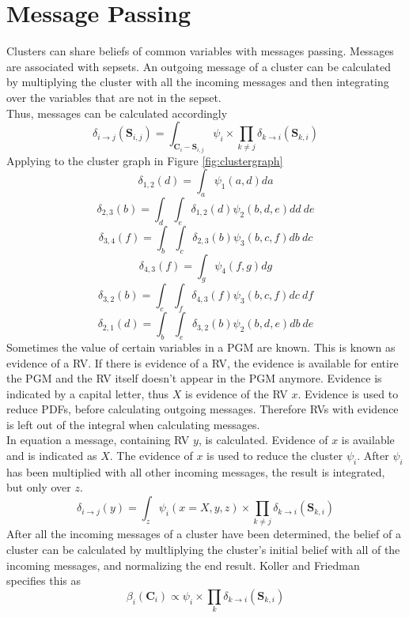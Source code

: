 \documentclass[12pt,oneside,openany,a4paper, %
afrikaans,english,
]{memoir}
\numberwithin{equation}{chapter}
\begin{document}
\section{Message Passing}
Clusters can share beliefs of common variables with messages passing. Messages are associated with sepsets. An outgoing message of a cluster can be calculated by multiplying the cluster with all the incoming messages and then integrating over the variables that are not in the sepset.
\\Thus, messages can be calculated accordingly~\citep{koller}
\begin{equation}
\delta_{i\to j}(\bm{S}_{i,j}) = \int_{\bm{C}_i - \bm{S}_{i,j}}\psi_i \times \prod_{k\ne j} \delta_{k\to i}(\bm{S}_{k,i})
\end{equation}
Applying to the cluster graph in Figure \ref{fig:clustergraph}
\begin{equation}\label{eq:del12}
\delta_{1,2}(d) = \int_a \psi_1(a,d)da
\end{equation}
\begin{equation}
\delta_{2,3}(b) = \int_d \int_e \delta_{1,2}(d)\psi_2(b,d,e)dd\ de
\end{equation}
\begin{equation}
\delta_{3,4}(f) = \int_b \int_c \delta_{2,3}(b)\psi_3(b,c,f)db\ dc
\end{equation}
\begin{equation}
\delta_{4,3}(f) = \int_g \psi_4(f,g)dg
\end{equation}
\begin{equation}
\delta_{3,2}(b) = \int_c \int_f \delta_{4,3}(f)\psi_3(b,c,f)dc\ df
\end{equation}
\begin{equation}
\delta_{2,1}(d) = \int_b \int_e \delta_{3,2}(b)\psi_2(b,d,e)db\ de
\end{equation}
Sometimes the value of certain variables in a PGM are known. This is known as evidence of a RV. If there is evidence of a RV, the evidence is available for entire the PGM and the RV itself doesn't appear in the PGM anymore. Evidence is indicated by a capital letter, thus $X$ is evidence of the RV $x$. Evidence is used to reduce PDFs, before calculating outgoing messages. Therefore RVs with evidence is left out of the integral when calculating messages.\\
In equation a message, containing RV $y$, is calculated. Evidence of $x$ is available and is indicated as $X$. The evidence of $x$ is used to reduce the cluster $\psi_i$. After $\psi_i$ has been multiplied with all other incoming messages, the result is integrated, but only over $z$.
\begin{equation}
\delta_{i\to j}(y) = \int_{z}\psi_i(x = X, y, z) \times \prod_{k\ne j} \delta_{k\to i}(\bm{S}_{k,i})
\end{equation}
After all the incoming messages of a cluster have been determined, the belief of a cluster can be calculated by multliplying the cluster's initial belief with all of the incoming messages, and normalizing the end result. Koller and Friedman~\cite{koller} specifies this as
\begin{equation}
\beta_i(\bm{C}_i) \propto \psi_i \times \prod_{k} \delta_{k \to i}(\bm{S}_{k,i})
\end{equation}
\end{document}

